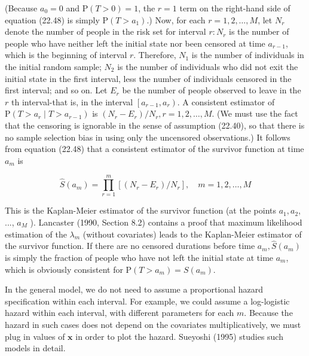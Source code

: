 \documentclass[10pt]{article}
\begin{document}
(Because $a_{0}=0$ and $\mathrm{P}(T>0)=1$, the $r=1$ term on the right-hand side of equation (22.48) is simply $\mathrm{P}\left(T>a_{1}\right)$.) Now, for each $r=1,2, \ldots, M$, let $N_{r}$ denote the number of people in the risk set for interval $r: N_{r}$ is the number of people who have neither left the initial state nor been censored at time $a_{r-1}$, which is the beginning of interval $r$. Therefore, $N_{1}$ is the number of individuals in the initial random sample; $N_{2}$ is the number of individuals who did not exit the initial state in the first interval, less the number of individuals censored in the first interval; and so on. Let $E_{r}$ be the number of people observed to leave in the $r$ th interval-that is, in the interval $\left[a_{r-1}, a_{r}\right)$. A consistent estimator of $\mathrm{P}\left(T>a_{r} \mid T>a_{r-1}\right)$ is $\left(N_{r}-E_{r}\right) / N_{r}, r=1,2, \ldots, M$. (We must use the fact that the censoring is ignorable in the sense of assumption (22.40), so that there is no sample selection bias in using only the uncensored observations.) It follows from equation (22.48) that a consistent estimator of the survivor function at time $a_{m}$ is


\begin{equation*}
\hat{S}\left(a_{m}\right)=\prod_{r=1}^{m}\left[\left(N_{r}-E_{r}\right) / N_{r}\right], \quad m=1,2, \ldots, M \tag{22.49}
\end{equation*}


This is the Kaplan-Meier estimator of the survivor function (at the points $a_{1}, a_{2}$, ..., $a_{M}$ ). Lancaster (1990, Section 8.2) contains a proof that maximum likelihood\\
estimation of the $\lambda_{m}$ (without covariates) leads to the Kaplan-Meier estimator of the survivor function. If there are no censored durations before time $a_{m}, \hat{S}\left(a_{m}\right)$ is simply the fraction of people who have not left the initial state at time $a_{m}$, which is obviously consistent for $\mathrm{P}\left(T>a_{m}\right)=S\left(a_{m}\right)$.

In the general model, we do not need to assume a proportional hazard specification within each interval. For example, we could assume a log-logistic hazard within each interval, with different parameters for each $m$. Because the hazard in such cases does not depend on the covariates multiplicatively, we must plug in values of $\mathbf{x}$ in order to plot the hazard. Sueyoshi (1995) studies such models in detail.
\end{document}
